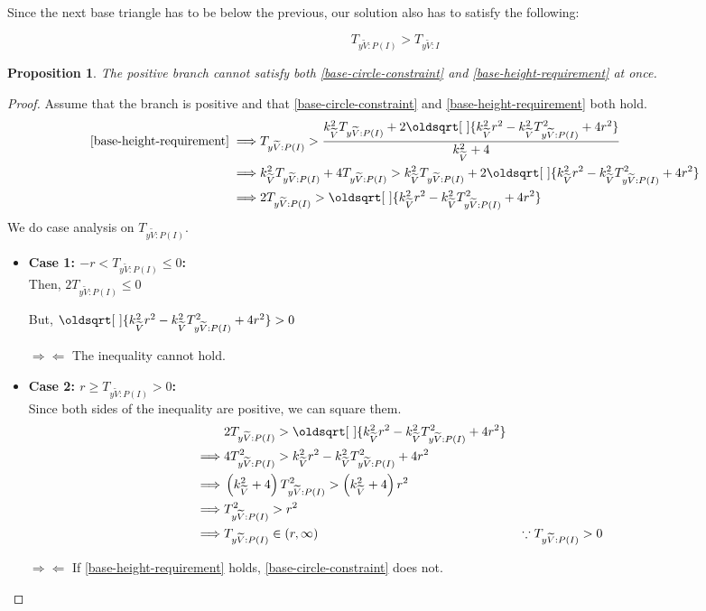 \documentclass[a4paper,12pt]{article}
\newcommand{\contradiction}{\Rightarrow\!\Leftarrow}
\newcommand{\HSview}[1][V]{\widetilde{#1}}
\newcommand{\HSTy}[1][I]{T_{y\HSview:#1}}
\renewcommand*{\sqrt}[2][\ ]{\oldsqrt[#1]{#2} }
\newtheorem{proposition}[theorem]{Proposition}
\theoremstyle{definition}
\theoremstyle{plain}
\begin{document}
	Since the next base triangle has to be below the previous, our solution also has to satisfy the following:

	\begin{equation}
		\HSTy[P(I)] > \HSTy \label{base-height-requirement}
	\end{equation}


	\begin{proposition}
		The positive branch cannot satisfy both \eqref{base-circle-constraint} and \eqref{base-height-requirement} at once.
	\end{proposition}
	\begin{proof}
		Assume that the branch is positive and that \eqref{base-circle-constraint} and \eqref{base-height-requirement} both hold.
		\begin{align*}
			\eqref{base-height-requirement} \implies & \HSTy[P(I)] > \frac{k^2_{\HSview}\HSTy[P(I)] + 2\sqrt{k^2_{\HSview}r^2 - k^2_{\HSview}\HSTy[P(I)]^2 + 4r^2}}{k^2_{\HSview} + 4}\\
			\implies & k^2_{\HSview}\HSTy[P(I)] + 4\HSTy[P(I)] > k^2_{\HSview}\HSTy[P(I)] + 2\sqrt{k^2_{\HSview}r^2 - k^2_{\HSview}\HSTy[P(I)]^2 + 4r^2}\\
			\implies & 2\HSTy[P(I)] > \sqrt{k^2_{\HSview}r^2 - k^2_{\HSview}\HSTy[P(I)]^2 + 4r^2}
		\end{align*}
		We do case analysis on $\HSTy[P(I)]$.
		\begin{itemize}
			\item \textbf{Case 1: $-r < \HSTy[P(I)] \le 0$:}\\
				Then, $2\HSTy[P(I)] \leq 0$

				But, $\sqrt{k^2_{\HSview}r^2 - k^2_{\HSview}\HSTy[P(I)]^2 + 4r^2} > 0$

				$\contradiction$ The inequality cannot hold. 
			\item \textbf{Case 2: $r \ge \HSTy[P(I)] > 0$:}\\
				Since both sides of the inequality are positive, we can square them.
				\begin{align*}
					& 2\HSTy[P(I)] > \sqrt{k^2_{\HSview}r^2 - k^2_{\HSview}\HSTy[P(I)]^2 + 4r^2}\\
					\implies & 4\HSTy[P(I)]^2 > k^2_{\HSview}r^2 - k^2_{\HSview}\HSTy[P(I)]^2 + 4r^2\\
					\implies & \left(k^2_{\HSview} + 4\right)\HSTy[P(I)]^2 > \left(k^2_{\HSview} + 4\right)r^2\\
					\implies & \HSTy[P(I)]^2 > r^2\\
					\implies & \HSTy[P(I)] \in \left(r, \infty\right) &&\because \HSTy[P(I)] > 0
				\end{align*}

				$\contradiction$ If \eqref{base-height-requirement} holds, \eqref{base-circle-constraint} does not.
		\end{itemize}
	\end{proof}
\end{document}
